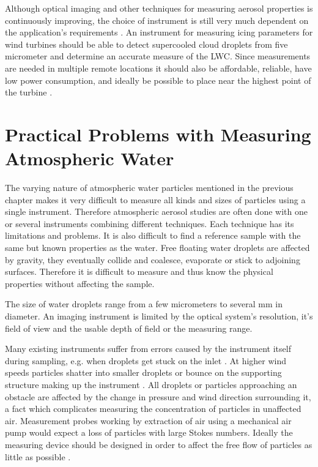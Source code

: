 Although optical imaging and other techniques for measuring aerosol properties is continuously improving, the choice of instrument is still very much dependent on the application’s requirements \cite{ide1999, baum1983, baum2011, kulk2011}. An instrument for measuring icing parameters for wind turbines should be able to detect supercooled cloud droplets from five micrometer and determine an accurate measure of the LWC. Since measurements are needed in multiple remote locations it should also be affordable, reliable, have low power consumption, and ideally be possible to place near the highest point of the turbine \cite{homo2006}.

\section{Practical Problems with Measuring Atmospheric Water}

The varying nature of atmospheric water particles mentioned in the previous chapter makes it very difficult to measure all kinds and sizes of particles using a single instrument. Therefore atmospheric aerosol studies are often done with one or several instruments combining different techniques. Each technique has its limitations and problems. It is also difficult to find a reference sample with the same but known properties as the water. Free floating water droplets are affected by gravity, they eventually collide and coalesce, evaporate or stick to adjoining  surfaces. Therefore it is difficult to measure and thus know the physical properties without affecting the sample.

The size of water droplets range from a few micrometers to several mm in diameter. An imaging instrument is limited by the optical system's resolution, it's field of view and the usable depth of field or the measuring range.

Many existing instruments suffer from errors caused by the instrument itself during sampling, e.g. when droplets get stuck on the inlet \cite{spie2012}. At higher wind speeds particles shatter into smaller droplets or bounce on the supporting structure making up the instrument \cite{cohen1991,field2006}. All droplets or particles approaching an obstacle are affected by the change in pressure and wind direction surrounding it, a fact which complicates measuring the concentration of particles in unaffected air. Measurement probes working by extraction of air using a mechanical air pump would expect a loss of particles with large Stokes numbers. Ideally the measuring device should be designed in order to affect the free flow of particles as little as possible \cite{baum2011}.

